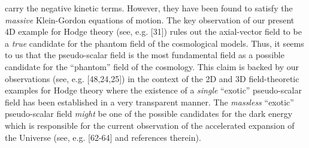 \documentclass[12pt]{article}
\begin{document}
carry the negative kinetic terms. However, they have been found to satisfy the {\it massive} Klein-Gordon equations of motion. The key observation of 
our present 4D example for Hodge theory (see, e.g. [31]) rules out the axial-vector field to be a {\it true} candidate for the phantom field
of the cosmological models. Thus, it seems to us that the pseudo-scalar field is the most fundamental field as a possible candidate
for the ``phantom'' field of the cosmology. This claim is backed by our observations (see, e.g. [48,24,25]) in the context of the 2D and 3D
field-theoretic examples for Hodge theory where the existence of a {\it single}  ``exotic'' pseudo-scalar field has been established in a very transparent manner.
The {\it massless} ``exotic'' pseudo-scalar field {\it might} be one of the possible candidates for the dark energy
which is responsible for the current observation of the accelerated expansion of the Universe (see, e.g. [62-64] and references therein). 
\end{document}
